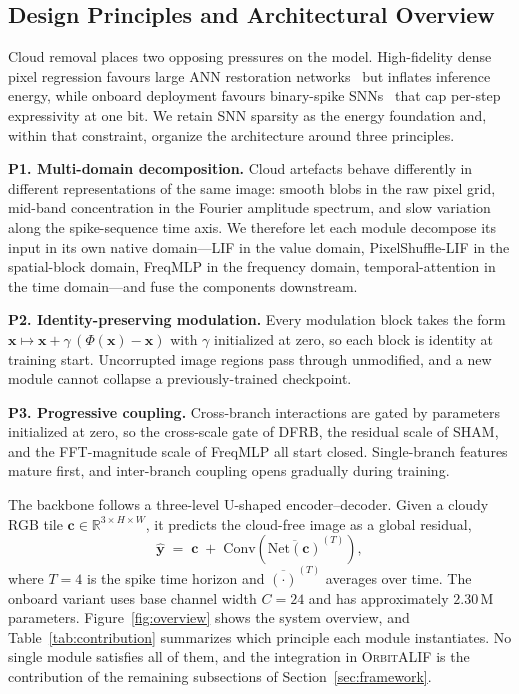 \documentclass[conference]{IEEEtran}
\newcommand{\OrbitALIF}{\textsc{OrbitALIF}}
\newcommand{\DFRB}{\textsc{DFRB}}
\newcommand{\SHAM}{\textsc{SHAM}}
\begin{document}
\subsection{Design Principles and Architectural Overview}
\label{sec:framework-principles}

Cloud removal places two opposing pressures on the model.
High-fidelity dense pixel regression favours large ANN restoration
networks~\cite{ref:cuhkcr} but inflates inference energy, while
onboard deployment favours binary-spike
SNNs~\cite{ref:flsnn,ref:esdnet} that cap per-step expressivity at
one bit. We retain SNN sparsity as the energy foundation and, within
that constraint, organize the architecture around three principles.

\textbf{P1. Multi-domain decomposition.} Cloud artefacts behave
differently in different representations of the same image: smooth
blobs in the raw pixel grid, mid-band concentration in the Fourier
amplitude spectrum, and slow variation along the spike-sequence time
axis. We therefore let each module decompose its input in its own
native domain---LIF in the value domain, PixelShuffle-LIF in the
spatial-block domain, FreqMLP in the frequency domain,
temporal-attention in the time domain---and fuse the components
downstream.

\textbf{P2. Identity-preserving modulation.} Every modulation block
takes the form
$\mathbf{x}\!\mapsto\!\mathbf{x}+\gamma\,(\Phi(\mathbf{x})-\mathbf{x})$
with $\gamma$ initialized at zero, so each block is identity at
training start. Uncorrupted image regions pass through unmodified,
and a new module cannot collapse a previously-trained checkpoint.

\textbf{P3. Progressive coupling.} Cross-branch interactions are
gated by parameters initialized at zero, so the cross-scale gate
of \DFRB{}, the residual scale of \SHAM{}, and the FFT-magnitude
scale of FreqMLP all start closed. Single-branch features mature
first, and inter-branch coupling opens gradually during training.

The backbone follows a three-level U-shaped encoder--decoder.
Given a cloudy RGB tile
$\mathbf{c}\!\in\!\mathbb{R}^{3\times H\times W}$, it predicts the
cloud-free image as a global residual,
\begin{equation}
\hat{\mathbf{y}}
\;=\;
\mathbf{c}\;+\;
\mathrm{Conv}\!\left(\overline{\mathrm{Net}(\mathbf{c})}^{(T)}\right),
\label{eq:globalresidual}
\end{equation}
where $T\!=\!4$ is the spike time horizon and
$\overline{(\cdot)}^{(T)}$ averages over time. The onboard variant
uses base channel width $C\!=\!24$ and has approximately
$2.30$\,M parameters. Figure~\ref{fig:overview} shows the system
overview, and Table~\ref{tab:contribution} summarizes which
principle each module instantiates. No single module satisfies all
of them, and the integration in \OrbitALIF{} is the contribution
of the remaining subsections of Section~\ref{sec:framework}.
\end{document}
